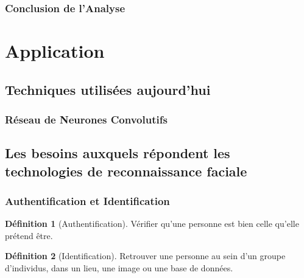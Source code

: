 \documentclass{beamer}
\theoremstyle{plain}
\theoremstyle{definition}
\newtheorem{defi}{Définition}
\begin{document}
\begin{frame}
  \frametitle{Conclusion de l'Analyse}
\end{frame}

\section{Application}
\subsection{Techniques utilisées aujourd'hui}

\begin{frame}
  \frametitle{Réseau de Neurones Convolutifs}
\end{frame}

\subsection{Les besoins auxquels répondent les technologies de reconnaissance faciale}
\begin{frame}
  \frametitle{Authentification et Identification}
  \begin{defi}[Authentification]
    Vérifier qu’une personne est bien celle qu’elle prétend être.
  \end{defi}
  \pause
  \begin{defi}[Identification]
    Retrouver une personne au sein d’un groupe d’individus, dans un lieu, une image ou une base de données.
  \end{defi}
\end{frame}
\end{document}
